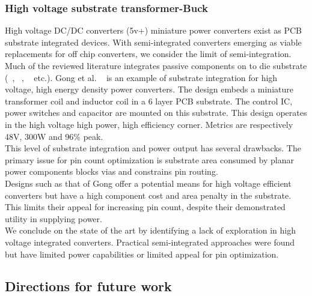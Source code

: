 \documentclass[letterpaper,twocolumn,10pt]{article}
\begin{document}
\subsubsection{High voltage substrate transformer-Buck }
High voltage DC/DC converters (5v+) miniature power converters exist as PCB substrate integrated devices. With semi-integrated converters emerging as viable replacements for off chip converters, we consider the limit of semi-integration. Much of the reviewed literature integrates passive components on to die substrate (~\cite{Pilawa2012}, ~\cite{Bathily2012}, ~\cite{Ng2012} etc.). Gong et al. ~\cite{Gong2008} is an example of substrate integration for high voltage, high energy density power converters. The design embeds a miniature transformer coil and inductor coil in a 6 layer PCB substrate. The control IC, power switches and capacitor are mounted on this substrate. This design operates in the high voltage high power, high efficiency corner. Metrics are respectively 48V, 300W and 96\% peak.\\
This level of substrate integration and power output has several drawbacks. The primary issue for pin count optimization is substrate area consumed by planar power components blocks vias and constrains pin routing.\\
Designs such as that of Gong offer a potential means for high voltage efficient converters but have a high component cost and area penalty in the substrate. This limits their appeal for increasing pin count, despite their demonstrated utility in supplying power.\\       
\indent We conclude on the state of the art by identifying a lack of exploration in high voltage integrated converters. Practical semi-integrated approaches were found but have limited power capabilities or limited appeal for pin optimization. 

\subsection{Directions for future work}
\end{document}
